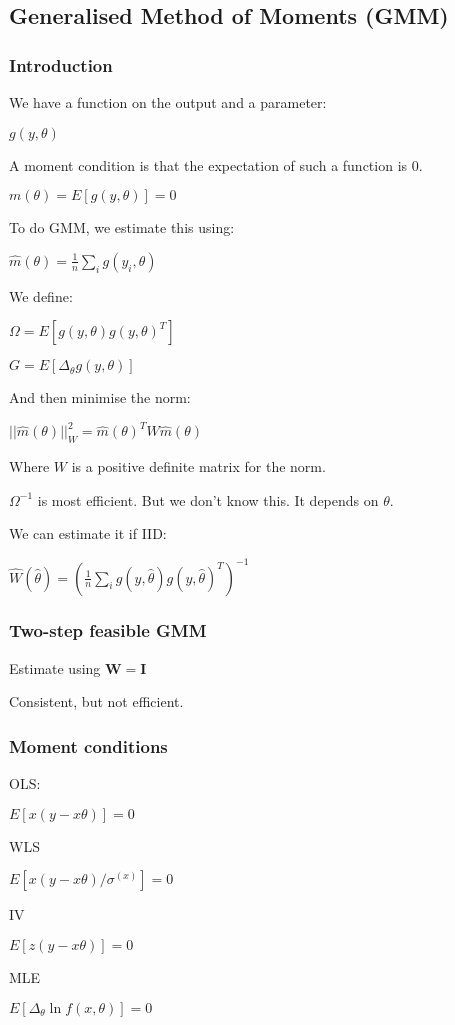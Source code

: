 
\subsection{Generalised Method of Moments (GMM)}

\subsubsection{Introduction}

We have a function on the output and a parameter:

\(g(y, \theta )\)

A moment condition is that the expectation of such a function is \(0\).

\(m(\theta )=E[g(y, \theta )]=0\)

To do GMM, we estimate this using:

\(\hat m(\theta )=\frac{1}{n}\sum_ig(y_i, \theta )\)

We define:

\(\Omega = E[g(y, \theta )g(y, \theta)^T]\)

\(G=E[\Delta_\theta g(y, \theta)]\)

And then minimise the norm:

\(||\hat m(\theta )||^2_W=\hat m(\theta )^TW\hat m(\theta )\)

Where \(W\) is a positive definite matrix for the norm.

\(\Omega ^{-1}\) is most efficient. But we don't know this. It depends on \(\theta \).

We can estimate it if IID:

\(\hat W(\hat \theta )= (\frac{1}{n}\sum_i g(y, \hat \theta)g(y, \hat \theta)^T)^{-1}\)

\subsubsection{Two-step feasible GMM}

Estimate using \(\mathbf W=\mathbf I\)

Consistent, but not efficient.

\subsubsection{Moment conditions}

OLS:

\(E[x(y-x\theta)]=0\)

WLS

\(E[x(y-x\theta)/\sigma^(x)]=0\)

IV

\(E[z(y-x\theta)]=0\)

MLE

\(E[\Delta_\theta \ln f(x, \theta)]=0\)

